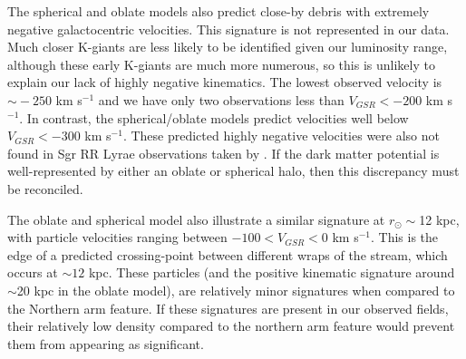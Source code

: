 \documentclass[preprint2]{aastex}
\begin{document}
	The spherical and oblate models also predict close-by debris with extremely negative galactocentric velocities. This signature is not represented in our data. Much closer K-giants are less likely to be identified given our luminosity range, although these early K-giants are much more numerous, so this is unlikely to explain our lack of highly negative kinematics.  The lowest observed velocity is $\sim{}-250$ km s$^{-1}$ and we have only two observations less than $V_{GSR} < -200$ km s$^{-1}$. In contrast, the spherical/oblate models predict velocities well below $V_{GSR} < -300$ km s$^{-1}$. These predicted highly negative  velocities were also not found in Sgr RR Lyrae observations taken by \citet{Prior;et-al_2009b}. If the dark matter potential is well-represented by either an oblate or spherical halo, then this discrepancy must be reconciled. 
	
	The oblate and spherical model also illustrate a similar signature at $r_\odot \sim$12 kpc, with particle velocities ranging between $-100 < V_{GSR} < 0$ km s$^{-1}$. This is the edge of a predicted crossing-point between different wraps of the stream, which occurs at $\sim12$ kpc. These particles (and the positive kinematic signature around $\sim$20 kpc in the oblate model), are relatively minor signatures when compared to the Northern arm feature. If these signatures are present in our observed fields, their relatively low density compared to the northern arm feature would prevent them from appearing as significant. %
\end{document}
